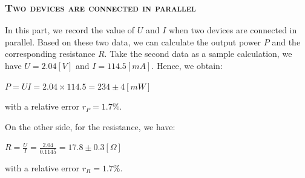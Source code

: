 \documentclass[a4paper,12pt]{article}
\begin{document}
\subsubsection{\textsc{Two devices are connected in parallel}}
In this part, we record the value of $U$ and $I$ when two devices are connected in parallel. Based on these two data, we can calculate the output power $P$ and the corresponding resistance $R$. Take the second data as a sample calculation, we have $U = 2.04 [V]$ and $I = 114.5 [mA]$. Hence, we obtain:
\begin{center}
$ P = UI = 2.04 \times 114.5 = 234 \pm 4 [mW] $
\end{center}
with a relative error $r_P = 1.7\%$.
\par On the other side, for the resistance, we have:
\begin{center}
$ \displaystyle R = \frac{U}{I} = \frac{2.04}{0.1145} = 17.8 \pm 0.3 [\Omega] $
\end{center}
with a relative error $r_R = 1.7\%$.
\end{document}
